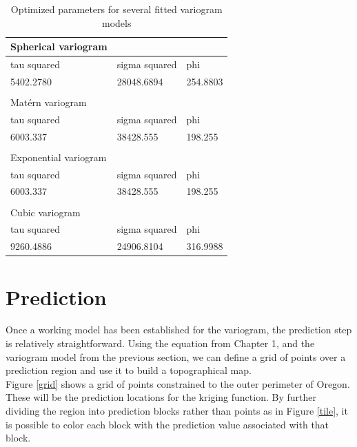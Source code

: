 \documentclass[12pt,twoside]{reedthesis}
\begin{document}
\begin{table}[h]

\centering

\begin{tabular}{l|l|l}

\hline
 Spherical variogram &&\\
\hline
tau squared  &  sigma squared     &   phi \\
\hline
 5402.2780 & 28048.6894  & 254.8803 \\
 \hline \\
 \hline
 Mat\'ern variogram&& \\
\hline
 tau squared  & sigma squared   &    phi \\
 \hline
 6003.337 & 38428.555  & 198.255 \\
 \hline \\
 \hline
 Exponential variogram & &\\
\hline
 tau squared  & sigma squared   &    phi \\
 \hline
 6003.337 & 38428.555  & 198.255 \\
 \hline \\
 \hline
Cubic variogram & &\\
\hline
 tau squared &   sigma squared    &    phi \\
 \hline
 9260.4886 & 24906.8104  & 316.9988 \\
 \hline
 
 \end{tabular}
 
 \caption{Optimized parameters for several fitted variogram models}
 \label{param}
 
 \end{table}
 
 \section{Prediction}
 
 Once a working model has been established for the variogram, the prediction step is relatively straightforward. Using the equation from Chapter 1, and the variogram model from the previous section, we can define a grid of points over a prediction region and use it to build a topographical map. \\
 
 Figure \ref{grid} shows a grid of points constrained to the outer perimeter of Oregon. These will be the prediction locations for the kriging function. By further dividing the region into prediction blocks rather than points as in Figure \ref{tile}, it is possible to color each block with the prediction value associated with that block. 
 
\end{document}
